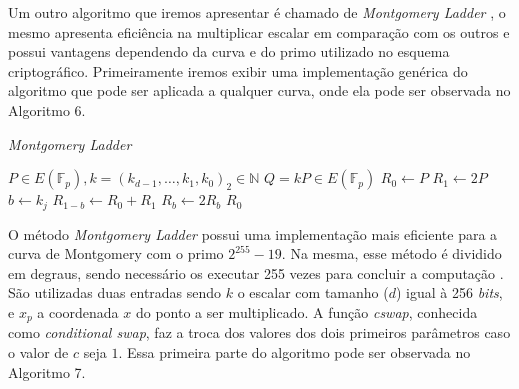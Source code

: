 Um outro algoritmo que iremos apresentar é chamado de \textit{Montgomery Ladder} \cite{Dull:2015:HCM:2834659.2834708}, o mesmo apresenta eficiência na multiplicar escalar em comparação com os outros e possui vantagens dependendo da curva e do primo utilizado no esquema criptográfico. Primeiramente iremos exibir uma implementação genérica do algoritmo que pode ser aplicada a qualquer curva, onde ela pode ser observada no Algoritmo 6.

\begin{algorithm}[H]
\caption{\emph{Montgomery Ladder}}
\begin{algorithmic} 
    \REQUIRE $P \in E(\mathbb{F}_p), k=(k_{d-1},\ldots,k_1,k_0)_2 \in \mathbb{N}$
    \ENSURE $Q = kP \in E(\mathbb{F}_p)$
    \STATE $R_0 \leftarrow P$
    \STATE $R_1 \leftarrow 2P$
        \STATE $b \leftarrow k_j$
        \STATE $R_{1-b} \leftarrow R_0 + R_1$
        \STATE $R_b \leftarrow 2R_b$
    \ENDFOR
    \RETURN $R_0$
    \end{algorithmic}
\end{algorithm}

O método \textit{Montgomery Ladder} possui uma implementação mais eficiente para a curva de Montgomery com o primo $2^{255}-19$. Na mesma, esse método é dividido em degraus, sendo necessário os executar 255 vezes para concluir a computação \cite{Dull:2015:HCM:2834659.2834708}. São utilizadas duas entradas sendo $k$ o escalar com tamanho ($d$) igual à 256 \textit{bits}, e $x_p$ a coordenada $x$ do ponto a ser multiplicado. A função \textit{cswap}, conhecida como \textit{conditional swap}, faz a troca dos valores dos dois primeiros parâmetros caso o valor de $c$ seja $1$. Essa primeira parte do algoritmo pode ser observada no Algoritmo 7.

